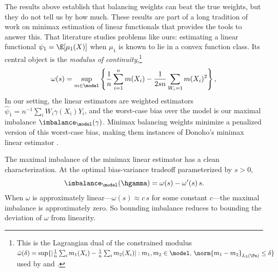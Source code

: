
The results above establish that balancing weights can beat the true weights, but they do not tell us by how much. These results are part of a long tradition of work on minimax estimation of linear functionals \citep{ibragimov1985nonparametric, donoho1991geometrizing, donoho1994statistical, armstrong2018optimal} that provides the tools to answer this. That literature studies problems like ours: estimating a linear functional $\psi_1 = \E[\mu_1(X)]$ when $\mu_1$ is known to lie in a convex function class. Its central object is the \emph{modulus of continuity},\footnote{This is the Lagrangian dual of the constrained modulus $\bar\omega(\delta) = \sup\{|\frac{1}{n}\sum_i m_1(X_i) - \frac{1}{n}\sum_i m_2(X_i)| : m_1, m_2 \in \model,\, \norm{m_1 - m_2}_{L_2(\Pn)} \le \delta\}$ used by \citet{donoho1994statistical} and \citet{armstrong2018optimal}.}
\begin{equation}
\label{eq:modulus-of-continuity}
\omega(s) = \sup_{m \in \model} \left\{ \frac{1}{n}\sum_{i=1}^n m(X_i) - \frac{1}{2sn} \sum_{W_i=1} m(X_i)^2 \right\},
\end{equation}
In our setting, the linear estimators are weighted estimators $\hat\psi_1 = n^{-1}\sum_i W_i \gamma(X_i) Y_i$, and the worst-case bias over the model is our maximal imbalance $\imbalance_\model(\gamma)$. Minimax balancing weights minimize a penalized version of this worst-case bias, making them instances of Donoho's minimax linear estimator \citep{donoho1994statistical, armstrong2018optimal}.

The maximal imbalance of the minimax linear estimator has a clean characterization. At the optimal bias-variance tradeoff parameterized by $s > 0$,
\begin{equation}
\label{eq:donoho-liu-bias}
\imbalance_\model(\hgamma) = \omega(s) - \omega'(s)\,s.
\end{equation}
When $\omega$ is approximately linear---$\omega(s) \approx c\,s$ for some constant $c$---the maximal imbalance is approximately zero. So bounding imbalance reduces to bounding the deviation of $\omega$ from linearity.
